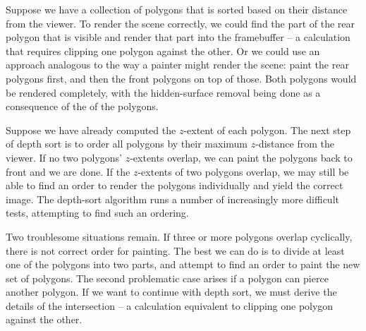 \documentclass[../COS3712_Notes.tex]{subfiles}
\begin{document}
        Suppose we have a collection of polygons that is sorted based on their distance
        from the viewer.
        To render the scene correctly, we could find the part of the rear polygon
        that is visible and render that part into the framebuffer
        -- a calculation that requires clipping one polygon against the other.
        Or we could use an approach analogous to the way a painter might render the scene:
        paint the rear polygons first, and then the front polygons on top of those.
        Both polygons would be rendered completely, with the hidden-surface removal
        being done as a consequence of the  of the polygons.

        Suppose we have already computed the $z$-extent of each polygon.
        The next step of depth sort is to order all polygons by their maximum $z$-distance
        from the viewer.
        If no two polygons' $z$-extents overlap, we can paint the polygons back to front and we
        are done.
        If the $z$-extents of two polygons overlap, we may still be able to find an order to
        render the polygons individually and yield the correct image.
        The depth-sort algorithm runs a number of increasingly more difficult tests,
        attempting to find such an ordering.

        Two troublesome situations remain.
        If three or more polygons overlap cyclically, there is not correct order for painting.
        The best we can do is to divide at least one of the polygons into two parts,
        and attempt to find an order to paint the new set of polygons.
        The second problematic case arises if a polygon can pierce another polygon.
        If we want to continue with depth sort, we must derive the details of the intersection
        -- a calculation equivalent to clipping one polygon against the other.
\end{document}
